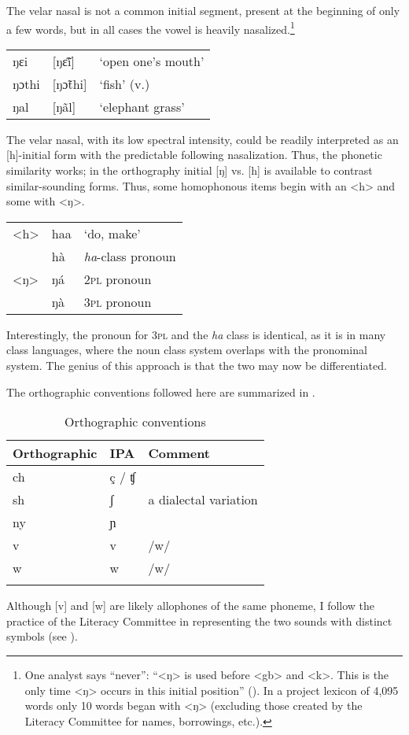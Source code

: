 The velar nasal is not a common initial segment, present at the beginning of only a few words, but in all cases the vowel is heavily nasalized.\footnote{One analyst says “never”: “<ŋ> is used before <gb> and <k>. This is the only time <ŋ> occurs in this initial position” (\citealt[1]{Hanson1979b}). In a project lexicon of 4,095 words only 10 words began with <ŋ> (excluding those created by the Literacy Committee for names, borrowings, etc.).}

\ea%
\label{ex:11}
\begin{tabular}[t]{lll}
ŋɛi & [ŋɛ̃\~\i] & ‘open one's mouth'\\
ŋɔthi & [ŋɔ̃thi] & ‘fish' (v.)\\
ŋal & [ŋãl] & ‘elephant grass'\\
\end{tabular}
\z

The velar nasal, with its low spectral intensity, could be readily interpreted as an [h]-initial form with the predictable following nasalization. Thus, the phonetic similarity works; in the orthography initial [ŋ] vs. [h] is available to contrast similar-sounding forms. Thus, some homophonous items begin with an <h> and some with <ŋ>.

\ea%
\label{ex:12}
\begin{tabular}[t]{lll}
<h> & haa & ‘do, make'\\
 & hà & \textit{ha}{}-class pronoun\\
<ŋ> & ŋá & 2\textsc{pl} pronoun\\
 & ŋà & 3\textsc{pl} pronoun\\
 \end{tabular}
 \z

Interestingly, the pronoun for 3\textsc{pl} and the \textit{ha} class is identical, as it is in many class languages, where the noun class system overlaps with the pronominal system. The genius of this approach is that the two may now be differentiated.

The orthographic conventions followed here are summarized in . 

\begin{table}
\caption{\label{tab:intro:3}Orthographic conventions}
\begin{tabular}{lll}
\lsptoprule
Orthographic & IPA & Comment\\
\midrule
ch & ç / ʧ & \\
sh & ʃ & a dialectal variation\\
ny & ɲ & \\
v & v & /w/\\
w & w & /w/\\
\lspbottomrule
\end{tabular}
\end{table}
Although [v] and [w] are likely allophones of the same phoneme, I follow the practice of the Literacy Committee in representing the two sounds with distinct symbols (see ).

